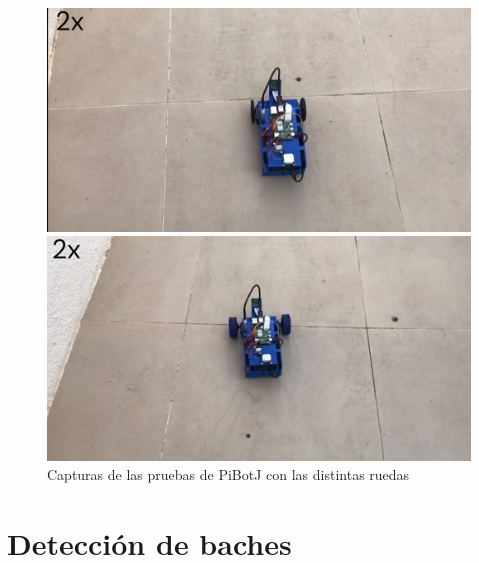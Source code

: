 \begin{figure}[ht!]
	\centering
	\begin{minipage}{0.45\linewidth}
		\centering
		\includegraphics[width=\linewidth]{figs/cap7/pruebanegra.png}
	\end{minipage}
	\hspace{1cm}
	\begin{minipage}{0.45\linewidth}
		\centering
		\includegraphics[width=\linewidth]{figs/cap7/pruebaazul.png}
	\end{minipage}
	\caption{Capturas de las pruebas de PiBotJ con las distintas ruedas}
	\label{fig:pruebaruedas}
\end{figure}


\section{Detección de baches}
\label{sec:expaa}


